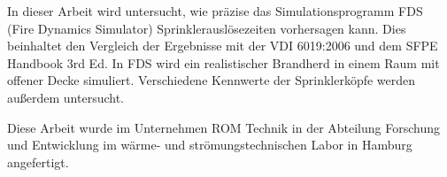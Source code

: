 In dieser Arbeit wird untersucht, wie präzise das Simulationsprogramm FDS (Fire Dynamics Simulator) Sprinklerauslösezeiten vorhersagen kann. Dies beinhaltet den Vergleich der Ergebnisse mit der VDI 6019:2006 und dem SFPE Handbook 3rd Ed. In FDS wird ein realistischer Brandherd in einem Raum mit offener Decke simuliert. Verschiedene Kennwerte der Sprinklerköpfe werden außerdem untersucht. 

Diese Arbeit wurde im Unternehmen ROM Technik in der Abteilung Forschung und Entwicklung im wärme- und strömungstechnischen Labor in Hamburg angefertigt.

